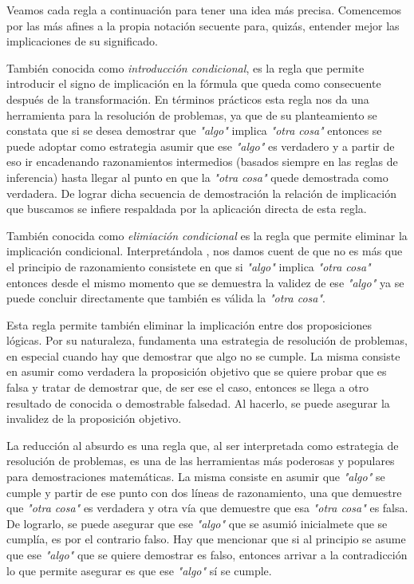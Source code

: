 Veamos cada regla a continuación para tener una idea más precisa. Comencemos por las más afines a la propia notación secuente para, quizás, entender mejor las implicaciones de su significado.



También conocida como \textit{introducción condicional}, es la regla que permite introducir el signo de implicación en la fórmula que queda como consecuente después de la transformación. En términos prácticos esta regla nos da una herramienta para la resolución de problemas, ya que de su planteamiento se constata que si se desea demostrar que \textit{"algo"} implica \textit{"otra cosa"} entonces se puede adoptar como estrategia asumir que ese \textit{"algo"} es verdadero y a partir de eso ir encadenando razonamientos intermedios (basados siempre en las reglas de inferencia) hasta llegar al punto en que la \textit{"otra cosa"} quede demostrada como verdadera. De lograr dicha secuencia de demostración la relación de implicación que buscamos se infiere respaldada por la aplicación directa de esta regla.



También conocida como \textit{elimiación condicional} es la regla que permite eliminar la implicación condicional. Interpretándola , nos damos cuent de que no es más que el principio de razonamiento consistete en que si \textit{"algo"} implica \textit{"otra cosa"} entonces desde el mismo momento que se demuestra la validez de ese \textit{"algo"} ya se puede concluir directamente que también es válida la \textit{"otra cosa"}.



Esta regla permite también eliminar la implicación entre dos proposiciones lógicas. Por su naturaleza, fundamenta una estrategia de resolución de problemas, en especial cuando hay que demostrar que algo no se cumple. La misma consiste en asumir como verdadera la proposición objetivo que se quiere probar que es falsa y tratar de demostrar que, de ser ese el caso, entonces se llega a otro resultado de conocida o demostrable falsedad. Al hacerlo, se puede asegurar la invalidez de la proposición objetivo.



La reducción al absurdo es una regla que, al ser interpretada como estrategia de resolución de problemas, es una de las herramientas más poderosas y populares para demostraciones matemáticas. La misma consiste en asumir que \textit{"algo"} se cumple y partir de ese punto con dos líneas de razonamiento, una que demuestre que \textit{"otra cosa"} es verdadera y otra vía que demuestre que esa \textit{"otra cosa"} es falsa. De lograrlo, se puede asegurar que ese \textit{"algo"} que se asumió inicialmete que se cumplía, es por el contrario falso. Hay que mencionar que si al principio se asume que ese \textit{"algo"} que se quiere demostrar es falso, entonces arrivar a la contradicción lo que permite asegurar es que ese \textit{"algo"} sí se cumple.

